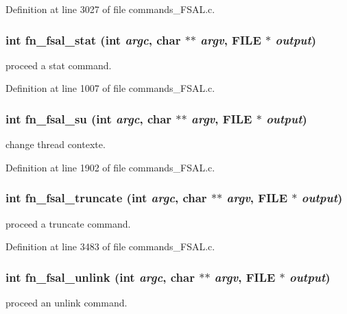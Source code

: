 Definition at line 3027 of file commands\_\-FSAL.c.
\subsubsection[{fn\_\-fsal\_\-stat}]{\setlength{\rightskip}{0pt plus 5cm}int fn\_\-fsal\_\-stat (int {\em argc}, \/  char $\ast$$\ast$ {\em argv}, \/  FILE $\ast$ {\em output})}\label{commands__FSAL_8c_ae507243945bd2b2378eaaa4b9ad07406}
proceed a stat command. 

Definition at line 1007 of file commands\_\-FSAL.c.
\subsubsection[{fn\_\-fsal\_\-su}]{\setlength{\rightskip}{0pt plus 5cm}int fn\_\-fsal\_\-su (int {\em argc}, \/  char $\ast$$\ast$ {\em argv}, \/  FILE $\ast$ {\em output})}\label{commands__FSAL_8c_a8b60c5a24b06782c3a35897b0e4de143}
change thread contexte. 

Definition at line 1902 of file commands\_\-FSAL.c.
\subsubsection[{fn\_\-fsal\_\-truncate}]{\setlength{\rightskip}{0pt plus 5cm}int fn\_\-fsal\_\-truncate (int {\em argc}, \/  char $\ast$$\ast$ {\em argv}, \/  FILE $\ast$ {\em output})}\label{commands__FSAL_8c_ad1e4eaf9bc2a2c768edee9550533f8fc}
proceed a truncate command. 

Definition at line 3483 of file commands\_\-FSAL.c.
\subsubsection[{fn\_\-fsal\_\-unlink}]{\setlength{\rightskip}{0pt plus 5cm}int fn\_\-fsal\_\-unlink (int {\em argc}, \/  char $\ast$$\ast$ {\em argv}, \/  FILE $\ast$ {\em output})}\label{commands__FSAL_8c_a8dbde159a7a808f5fc63ee46bfbb0aa2}
proceed an unlink command. 

